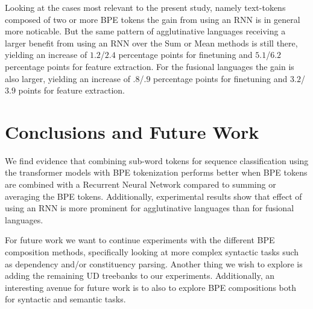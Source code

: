 \documentclass[11pt]{article}
\begin{document}
         Looking at the cases most relevant to the present study,
     namely text-tokens composed of two or more BPE tokens the gain
     from using an RNN is in general more noticable. But the same
     pattern of agglutinative languages receiving a larger benefit
     from using an RNN over the Sum or Mean methods is still there,
     yielding an increase of $1.2$/$2.4$ percentage points for
     finetuning and $5.1$/$6.2$ percentage points for feature
     extraction. For the fusional languages the gain is also larger,
     yielding an increase of $.8$/$.9$ percentage points for
     finetuning and $3.2$/$3.9$ points for feature extraction.
    
    \section{Conclusions and Future Work}
    
        We find evidence that combining sub-word tokens for sequence
     classification using the transformer models with BPE tokenization
     performs better when BPE tokens are combined with a Recurrent
     Neural Network compared to summing or averaging the BPE tokens.
         Additionally, experimental results show that effect of using
     an RNN is more prominent for agglutinative languages than for
     fusional languages.

                For future work we want to continue experiments with
     the different BPE composition methods, specifically looking at
     more complex syntactic tasks such as dependency and/or
     constituency parsing. Another thing we wish to explore is adding
     the remaining UD treebanks to our experiments.  Additionally, an
     interesting avenue for future work is to also to explore BPE
     compositions both for syntactic and semantic tasks.
    

	
	
	
\end{document}
